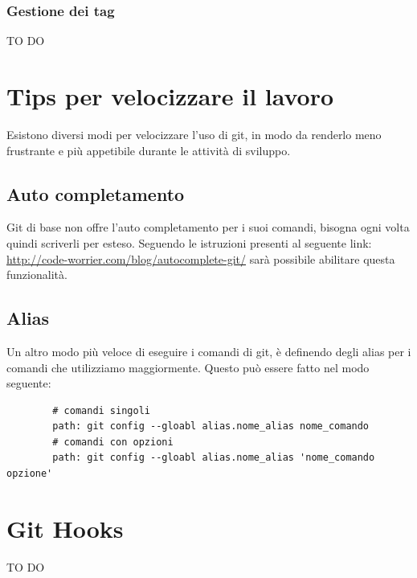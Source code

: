 		\subsubsection{Gestione dei tag} %
		\label{ssub:gestione_dei_tag_remoto}
		TO DO



\newpage \clearpage
\section{Tips per velocizzare il lavoro} %
\label{sec:tips_per_velocizzare_il_lavoro}
Esistono diversi modi per velocizzare l'uso di git, in modo da renderlo meno frustrante e più appetibile durante le attività di sviluppo.
	\subsection{Auto completamento} %
	\label{sub:auto_completamento}
	Git di base non offre l'auto completamento per i suoi comandi, bisogna ogni volta quindi scriverli per esteso. Seguendo le istruzioni presenti al seguente link: \url{http://code-worrier.com/blog/autocomplete-git/} sarà possibile abilitare questa funzionalità.

	\subsection{Alias} %
	\label{sub:alias}
	Un altro modo più veloce di eseguire i comandi di git, è definendo degli alias per i comandi che utilizziamo maggiormente. Questo può essere fatto nel modo seguente:
	\begin{verbatim}
		# comandi singoli
		path: git config --gloabl alias.nome_alias nome_comando
		# comandi con opzioni
		path: git config --gloabl alias.nome_alias 'nome_comando opzione'
	\end{verbatim}


\newpage \clearpage
\section{Git Hooks} %
\label{sec:git_hooks}
TO DO






